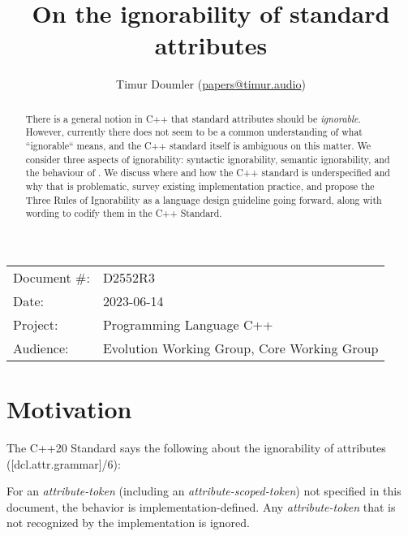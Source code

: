 

\newcommand{\forceindent}{\parindent=1em\indent\parindent=0pt\relax} %


\title{On the ignorability of standard attributes}
\author{
  Timur Doumler \small(\href{mailto:papers@timur.audio}{papers@timur.audio})
}
\date{}
\maketitle

\begin{tabular}{ll}
Document \#: & D2552R3 \\
Date: & 2023-06-14\\
Project: & Programming Language C++ \\
Audience: & Evolution Working Group, Core Working Group
\end{tabular}


\begin{abstract}
There is a general notion in C++ that standard attributes should be \emph{ignorable}. However, currently there does not seem to be a common understanding of what ``ignorable`` means, and the C++ standard itself is ambiguous on this matter. We consider three aspects of ignorability: syntactic ignorability, semantic ignorability, and the behaviour of \mbox{}. We discuss where and how the C++ standard is underspecified and why that is problematic, survey existing implementation practice, and propose the Three Rules of Ignorability as a language design guideline going forward, along with wording to codify them in the C++ Standard.
\end{abstract}


\section{Motivation}
\label{sec:motivation}


The C++20 Standard says the following about the ignorability of attributes ([dcl.attr.grammar]/6):

\begin{adjustwidth}{0.5cm}{0.5cm}
For an \emph{attribute-token} (including an \emph{attribute-scoped-token})  not specified in this document, the behavior is implementation-defined. Any \emph{attribute-token} that is not recognized by the implementation is ignored.
\end{adjustwidth}

